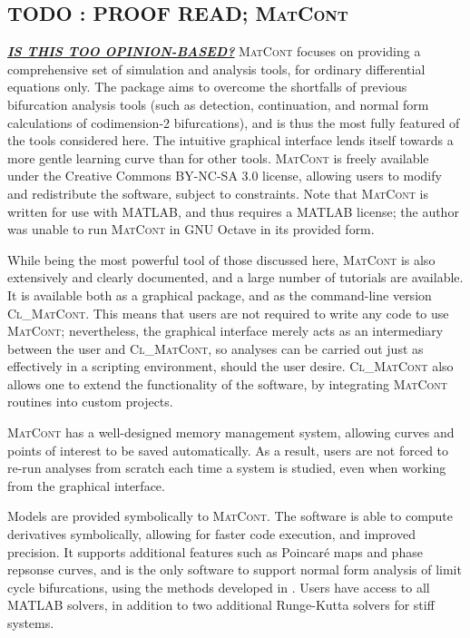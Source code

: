 \documentclass[a4paper,twoside]{article}
\newcommand{\matcont}{\textsc{MatCont}}
\newcommand{\clmatcont}{\textsc{Cl\_MatCont}}
\begin{document}
\subsection{{\bfseries\sffamily TODO} : PROOF READ; \matcont{}}
\label{sec:org99d3f31}
\uline{\emph{\textbf{IS THIS TOO OPINION-BASED?}}}
\matcont{} focuses on providing a comprehensive set of simulation and analysis tools, for ordinary differential equations only.
The package aims to overcome the shortfalls of previous bifurcation analysis tools (such as detection, continuation, and normal form calculations of codimension-2 bifurcations), and is thus the most fully featured of the tools considered here.
The intuitive graphical interface lends itself towards a more gentle learning curve than for other tools.
\matcont{} is freely available under the Creative Commons BY-NC-SA 3.0 license, allowing users to modify and redistribute the software, subject to constraints.
Note that \matcont{} is written for use with MATLAB, and thus requires a MATLAB license; the author was unable to run \matcont{} in GNU Octave in its provided form.

While being the most powerful tool of those discussed here, \matcont{} is also extensively and clearly documented, and a large number of tutorials are available.
It is available both as a graphical package, and as the command-line version \clmatcont{}.
This means that users are not required to write any code to use \matcont{}; nevertheless, the graphical interface merely acts as an intermediary between the user and \clmatcont{}, so analyses can be carried out just as effectively in a scripting environment, should the user desire.
\clmatcont{} also allows one to extend the functionality of the software, by integrating \matcont{} routines into custom projects.

\matcont{} has a well-designed memory management system, allowing curves and points of interest to be saved automatically.
As a result, users are not forced to re-run analyses from scratch each time a system is studied, even when working from the graphical interface.

Models are provided symbolically to \matcont{}.
The software is able to compute derivatives symbolically, allowing for faster code execution, and improved precision.
It supports additional features such as Poincar\'{e} maps and phase repsonse curves, and is the only software to support normal form analysis of limit cycle bifurcations, using the methods developed in \cite{kuznetsov2005numerical}.
Users have access to all MATLAB solvers, in addition to two additional Runge-Kutta solvers for stiff systems.
\end{document}

